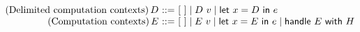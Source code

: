 \documentclass[preprint]{sigplanconf}
\makeatletter
\newcommand{\many}{\overline}
\newcommand\ba{\begin{array}}
\newcommand\ea{\end{array}}
\newenvironment{equations}{\[\ba{@{}r@{~}c@{~}l@{}}}{\ea\]}
\newcommand{\key}[1]{\mathsf{#1}}
\newcommand{\handleSymbol}{\mathbin{?}}
\newcommand{\handle}[2]{{#1} \handleSymbol {#2}}
\newcommand{\force}[1]{{#1}!}
\makeatother
\begin{document}
\begin{figure*}

\begin{equations}
(\textrm{Delimited computation contexts})\, D
  &::=& [~] \mid D~v \mid \key{let}~x=D~\key{in}~e \\
(\textrm{Computation contexts})\, E
  &::=& [~] \mid E~v \mid \key{let}~x=E~\key{in}~e
            \mid \key{handle}~E~\key{with}~H \\
\end{equations}%


\end{figure*}
\end{document}
